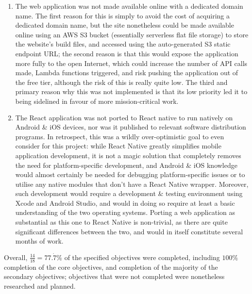\documentclass[a4paper,11pt]{report}
\begin{document}
\begin{enumerate}
    \item   The web application was not made available online with a dedicated domain name.
            The first reason for this is simply to avoid the cost of acquiring a dedicated domain name, but the site nonetheless could be made available online using an AWS S3 bucket\supercite{s3} (essentially serverless flat file storage) to store the website's build files, and accessed using the auto-generated S3 static endpoint URL;
            the second reason is that this would expose the application more fully to the open Internet, which could increase the number of API calls made, Lambda functions triggered, and risk pushing the application out of the free tier, although the risk of this is really quite low.
            The third and primary reason why this was not implemented is that its low priority led it to being sidelined in favour of more mission-critical work.

    \item   The React application was not ported to React native to run natively on Android \& iOS devices, nor was it published to relevant software distribution programs.
            In retrospect, this was a wildly over-optimistic goal to even consider for this project:
            while React Native greatly simplifies mobile application development, it is not a magic solution that completely removes the need for platform-specific development, and Android \& iOS knowledge would almost certainly be needed for debugging platform-specific issues or to utilise any native modules that don't have a React Native wrapper.
            Moreover, such development would require a development \& testing environment using Xcode and Android Studio, and would in doing so require at least a basic understanding of the two operating systems.
            Porting a web application as substantial as this one to React Native is non-trivial, as there are quite significant differences between the two, and would in itself constitute several months of work.
\end{enumerate}

Overall, $\frac{14}{18} = 77.\dot{7} \%$ of the specified objectives were completed, including $100\%$ completion of the core objectives, and completion of the majority of the secondary objectives;
objectives that were not completed were nonetheless researched and planned.
\end{document}
